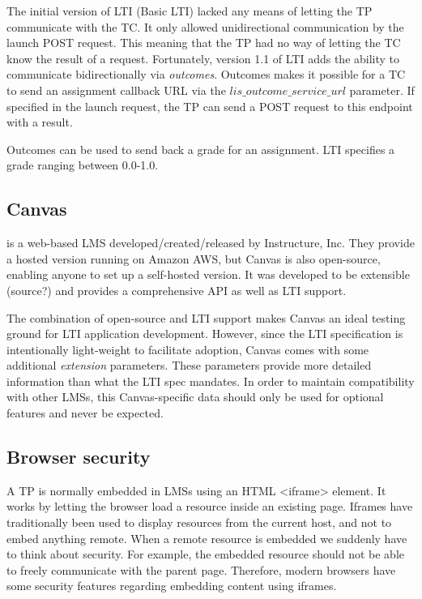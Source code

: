 The initial version of LTI (Basic LTI) lacked any means of letting the TP communicate with the TC. It only allowed unidirectional communication by the launch POST request. This meaning that the TP had no way of letting the TC know the result of a request. Fortunately, version 1.1 of LTI adds the ability to communicate bidirectionally via \textit{outcomes}. Outcomes makes it possible for a TC to send an assignment callback URL via the $lis\_outcome\_service\_url$ parameter. If specified in the launch request, the TP can send a POST request to this endpoint with a result.

Outcomes can be used to send back a grade for an assignment. LTI specifies a grade ranging between 0.0-1.0. %

\subsection{Canvas}

\cite{2019Canvas} is a web-based LMS developed/created/released by Instructure, Inc. They provide a hosted version running on Amazon AWS, but Canvas is also open-source, enabling anyone to set up a self-hosted version. It was developed to be extensible (source?) and provides a comprehensive API as well as LTI support.

The combination of open-source and LTI support makes Canvas an ideal testing ground for LTI application development. However, since the LTI specification is intentionally light-weight to facilitate adoption, Canvas comes with some additional \emph{extension} parameters. These parameters provide more detailed information than what the LTI spec mandates. In order to maintain compatibility with other LMSs, this Canvas-specific data should only be used for optional features and never be expected.

\subsection{Browser security}

A TP is normally embedded in LMSs using an HTML <iframe> element. It works by letting the browser load a resource inside an existing page. Iframes have traditionally been used to display resources from the current host, and not to embed anything remote. When a remote resource is embedded we suddenly have to think about security. For example, the embedded resource should not be able to freely communicate with the parent page. Therefore, modern browsers have some security features regarding embedding content using iframes.

